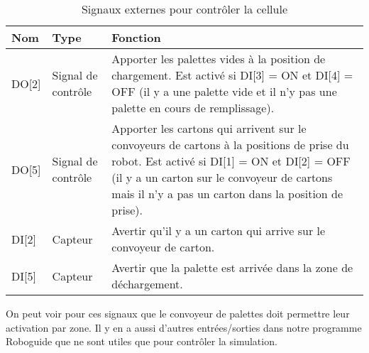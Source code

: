 \begin{table}[H]
	\caption{Signaux externes pour contrôler la cellule}
	\label{tab:signaux}
	\begin{tabularx}{\textwidth}{>{\centering\arraybackslash}X|>{\centering\arraybackslash}X|>{\centering\arraybackslash}X}
		
		\textbf{Nom}&
		\textbf{Type}&
		\textbf{Fonction}\\
		\hline
		DO[2]&
		Signal de contrôle&
		Apporter les palettes vides à la position de chargement. Est activé si DI[3] = ON et DI[4] = OFF (il y a une palette vide et il n’y pas une palette en cours de remplissage).\\
		\hline
		DO[5]&
		Signal de contrôle&
		Apporter les cartons qui arrivent sur le convoyeurs de cartons à la positions de prise du robot. Est activé si DI[1] = ON et DI[2] = OFF (il y a un carton sur le convoyeur de cartons mais il n’y a pas un carton dans la position de prise). \\
		\hline
		DI[2]&
		Capteur&
		Avertir qu’il y a un carton qui arrive sur le convoyeur de carton.\\
		\hline
		DI[5]&
		Capteur&
		Avertir que la palette est arrivée dans la zone de déchargement.\\		
	\end{tabularx}
\end{table}




\newpage
On peut voir pour ces signaux que le convoyeur de palettes doit permettre leur activation par zone.
Il y en a aussi d’autres entrées/sorties dans notre programme Roboguide que ne sont utiles que pour contrôler la simulation.




